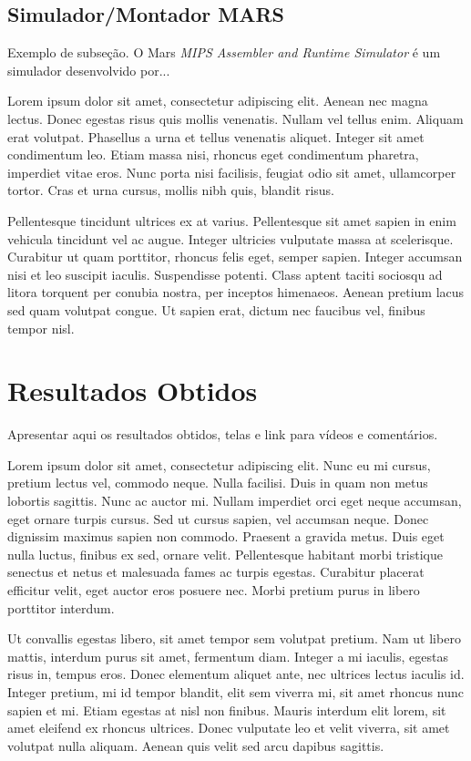 \documentclass[10pt, conference, compsocconf]{IEEEtran}
\begin{document}
\subsection{Simulador/Montador MARS}{
\label{sec:Mars}
Exemplo de subseção. O Mars \textit{MIPS Assembler and Runtime Simulator} \cite{Mars1} é um simulador desenvolvido por...

Lorem ipsum dolor sit amet, consectetur adipiscing elit. Aenean nec magna lectus. Donec egestas risus quis mollis venenatis. Nullam vel tellus enim. Aliquam erat volutpat. Phasellus a urna et tellus venenatis aliquet. Integer sit amet condimentum leo. Etiam massa nisi, rhoncus eget condimentum pharetra, imperdiet vitae eros. Nunc porta nisi facilisis, feugiat odio sit amet, ullamcorper tortor. Cras et urna cursus, mollis nibh quis, blandit risus.

Pellentesque tincidunt ultrices ex at varius. Pellentesque sit amet sapien in enim vehicula tincidunt vel ac augue. Integer ultricies vulputate massa at scelerisque. Curabitur ut quam porttitor, rhoncus felis eget, semper sapien. Integer accumsan nisi et leo suscipit iaculis. Suspendisse potenti. Class aptent taciti sociosqu ad litora torquent per conubia nostra, per inceptos himenaeos. Aenean pretium lacus sed quam volutpat congue. Ut sapien erat, dictum nec faucibus vel, finibus tempor nisl. 
}


\section{Resultados Obtidos}
\label{sec:Resultados}
Apresentar aqui os resultados obtidos, telas e link para vídeos e comentários.



Lorem ipsum dolor sit amet, consectetur adipiscing elit. Nunc eu mi cursus, pretium lectus vel, commodo neque. Nulla facilisi. Duis in quam non metus lobortis sagittis. Nunc ac auctor mi. Nullam imperdiet orci eget neque accumsan, eget ornare turpis cursus. Sed ut cursus sapien, vel accumsan neque. Donec dignissim maximus sapien non commodo. Praesent a gravida metus. Duis eget nulla luctus, finibus ex sed, ornare velit. Pellentesque habitant morbi tristique senectus et netus et malesuada fames ac turpis egestas. Curabitur placerat efficitur velit, eget auctor eros posuere nec. Morbi pretium purus in libero porttitor interdum.

Ut convallis egestas libero, sit amet tempor sem volutpat pretium. Nam ut libero mattis, interdum purus sit amet, fermentum diam. Integer a mi iaculis, egestas risus in, tempus eros. Donec elementum aliquet ante, nec ultrices lectus iaculis id. Integer pretium, mi id tempor blandit, elit sem viverra mi, sit amet rhoncus nunc sapien et mi. Etiam egestas at nisl non finibus. Mauris interdum elit lorem, sit amet eleifend ex rhoncus ultrices. Donec vulputate leo et velit viverra, sit amet volutpat nulla aliquam. Aenean quis velit sed arcu dapibus sagittis.
\end{document}
